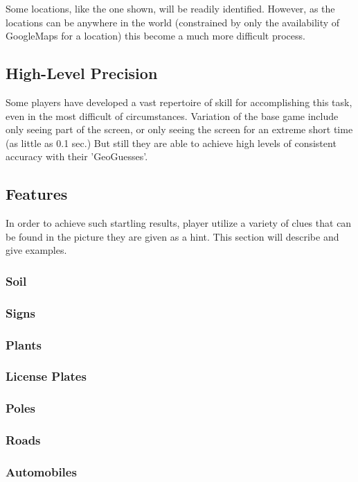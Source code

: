 \documentclass{article}
\begin{document}
\begin{multicols}{2}
		
	
	Some locations, like the one shown, will be readily identified. However, as the locations can be anywhere in the world (constrained by only the availability of GoogleMaps for a location) this become a much more difficult process. 
	
	\subsection{High-Level Precision}
	Some players have developed a vast repertoire of skill for accomplishing this task, even in the most difficult of circumstances. Variation of the base game include only seeing part of the screen, or only seeing the screen for an extreme short time (as little as 0.1 sec.) But still they are able to achieve high levels of consistent accuracy with their 'GeoGuesses'. 
	
	\subsection{Features}
	In order to achieve such startling results, player utilize a variety of clues that can be found in the picture they are given as a hint. This section will describe and give examples.
	
	\subsubsection{Soil}
	\subsubsection{Signs}
	\subsubsection{Plants}
	\subsubsection{License Plates}
	\subsubsection{Poles}
	\subsubsection{Roads}
	\subsubsection{Automobiles}

\end{multicols}
\end{document}
